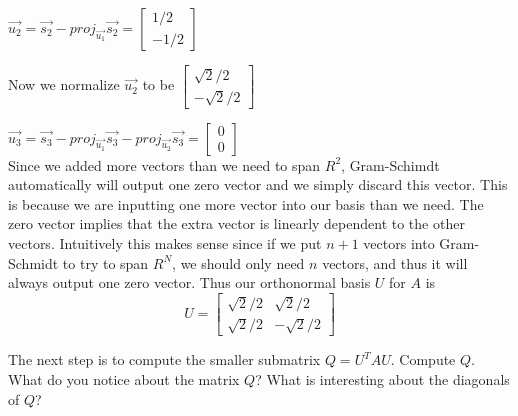 \begin{enumerate}
{    $\vec{u_2} = \vec{s_2} - proj_{\vec{u_1}}\vec{s_2} = \begin{bmatrix}
        1/2 \\
        -1/2
    \end{bmatrix}$ 

    Now we normalize $\vec{u_2}$ to be 
    $
    \begin{bmatrix}
        \sqrt{2}/2\\
        -\sqrt{2}/2
    \end{bmatrix}
    $
    
    $\vec{u_3} = \vec{s_3} - proj_{\vec{u_1}}\vec{s_3} - proj_{\vec{u_2}}\vec{s_3} = 
    \begin{bmatrix}
        0 \\
        0 
    \end{bmatrix}$ \\

    Since we added more vectors than we need to span $R^2$, Gram-Schimdt automatically will output one zero vector and we simply 
    discard this vector. This is because we are inputting one more vector into our basis than we need. The zero vector implies that
    the extra vector is linearly dependent to the other vectors. Intuitively this makes sense since if we put $n+1$ vectors into 
    Gram-Schmidt to try to span $R^N$, we should only need $n$ vectors, and thus it will always output one zero vector. 
    Thus our orthonormal basis $U$ for $A$ is 
    \[
    U = \begin{bmatrix}
    \sqrt{2}/2 &  \sqrt{2}/2\\
    \sqrt{2}/2 &  -\sqrt{2}/2
    \end{bmatrix}
    \]

    }

    \qitem The next step is to compute the smaller submatrix $Q = U^TAU$. Compute $Q$. What do you notice about the matrix 
    $Q$? What is interesting about the diagonals of $Q$?
    \ws{
    \vspace{150px}
    }

    \sol{
        \[
        Q =  \begin{bmatrix}
            \sqrt{2}/2 &  \sqrt{2}/2\\
            \sqrt{2}/2 &  -\sqrt{2}/2
            \end{bmatrix}^T 
            \begin{bmatrix}
                1 & 1 \\
                -1 & 3 \\
            \end{bmatrix}
            \begin{bmatrix}
                \sqrt{2}/2 &  \sqrt{2}/2\\
                \sqrt{2}/2 &  -\sqrt{2}/2
            \end{bmatrix} =
        \begin{bmatrix}
            2 &  2\\
            0 &  2
        \end{bmatrix}
        \]

}
\end{enumerate}
